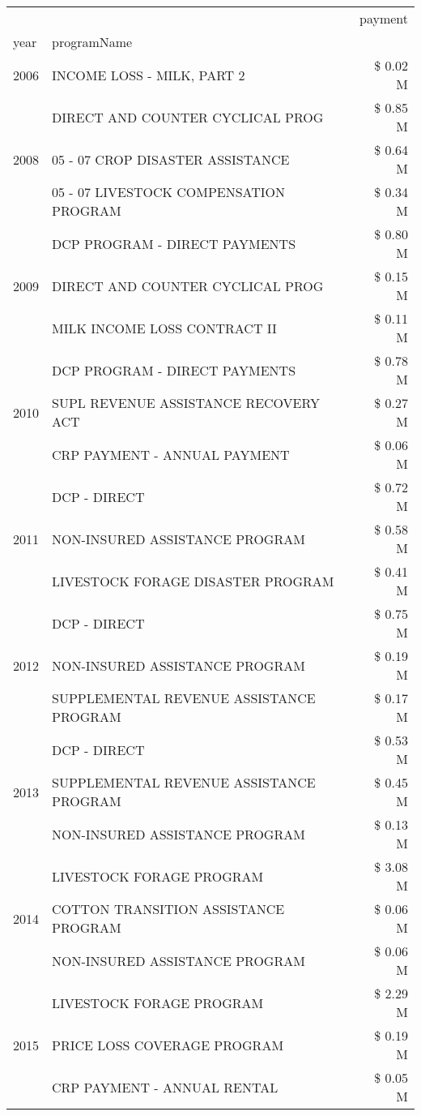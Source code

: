 \begin{tabular}{llr}
\toprule
 &  & payment \\
year & programName &  \\
\midrule
2006 & INCOME LOSS - MILK, PART 2 & \$ 0.02 M \\
\cline{1-3}
\multirow[t]{3}{*}{2008} & DIRECT AND COUNTER CYCLICAL PROG & \$ 0.85 M \\
 & 05 - 07 CROP DISASTER ASSISTANCE & \$ 0.64 M \\
 & 05 - 07 LIVESTOCK COMPENSATION PROGRAM & \$ 0.34 M \\
\cline{1-3}
\multirow[t]{3}{*}{2009} & DCP PROGRAM - DIRECT PAYMENTS & \$ 0.80 M \\
 & DIRECT AND COUNTER CYCLICAL PROG & \$ 0.15 M \\
 & MILK INCOME LOSS CONTRACT II & \$ 0.11 M \\
\cline{1-3}
\multirow[t]{3}{*}{2010} & DCP PROGRAM - DIRECT PAYMENTS & \$ 0.78 M \\
 & SUPL REVENUE ASSISTANCE RECOVERY ACT & \$ 0.27 M \\
 & CRP PAYMENT - ANNUAL PAYMENT & \$ 0.06 M \\
\cline{1-3}
\multirow[t]{3}{*}{2011} & DCP - DIRECT & \$ 0.72 M \\
 & NON-INSURED ASSISTANCE PROGRAM & \$ 0.58 M \\
 & LIVESTOCK FORAGE DISASTER PROGRAM & \$ 0.41 M \\
\cline{1-3}
\multirow[t]{3}{*}{2012} & DCP - DIRECT & \$ 0.75 M \\
 & NON-INSURED ASSISTANCE PROGRAM & \$ 0.19 M \\
 & SUPPLEMENTAL REVENUE ASSISTANCE PROGRAM & \$ 0.17 M \\
\cline{1-3}
\multirow[t]{3}{*}{2013} & DCP - DIRECT & \$ 0.53 M \\
 & SUPPLEMENTAL REVENUE ASSISTANCE PROGRAM & \$ 0.45 M \\
 & NON-INSURED ASSISTANCE PROGRAM & \$ 0.13 M \\
\cline{1-3}
\multirow[t]{3}{*}{2014} & LIVESTOCK FORAGE PROGRAM & \$ 3.08 M \\
 & COTTON TRANSITION ASSISTANCE PROGRAM & \$ 0.06 M \\
 & NON-INSURED ASSISTANCE PROGRAM & \$ 0.06 M \\
\cline{1-3}
\multirow[t]{3}{*}{2015} & LIVESTOCK FORAGE PROGRAM & \$ 2.29 M \\
 & PRICE LOSS COVERAGE PROGRAM & \$ 0.19 M \\
 & CRP PAYMENT - ANNUAL RENTAL & \$ 0.05 M \\

\end{tabular}
